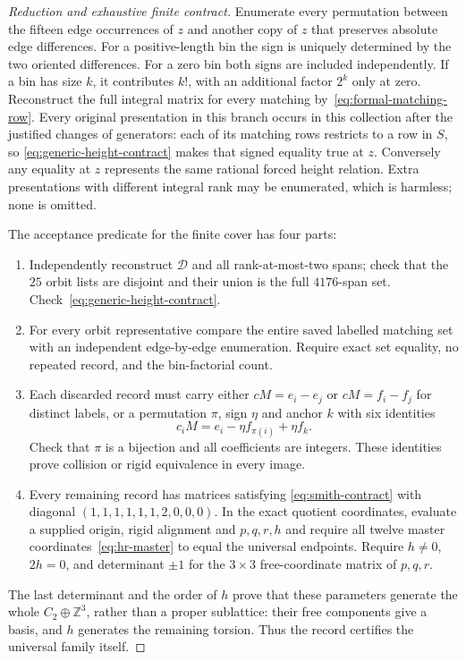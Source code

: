 \documentclass[11pt]{article}
\theoremstyle{remark}
\newcommand{\Z}{\mathbb Z}
\begin{document}
\begin{proof}[Reduction and exhaustive finite contract]
Enumerate every permutation between the fifteen edge occurrences of
$z$ and another copy of $z$ that preserves absolute edge differences.
For a positive-length bin the sign is uniquely determined by the two
oriented differences. For a zero bin both signs are included independently.
If a bin has size $k$, it contributes $k!$, with an additional factor
$2^k$ only at zero. Reconstruct the full integral matrix for every
matching by~\eqref{eq:formal-matching-row}. Every original presentation
in this branch occurs in this collection after the justified changes of
generators: each of its matching rows restricts to a row in $S$, so
\eqref{eq:generic-height-contract} makes that signed equality true at
$z$. Conversely any equality at $z$ represents the same rational forced
height relation. Extra presentations with different integral rank may
be enumerated, which is harmless; none is omitted.

The acceptance predicate for the finite cover has four parts:
\begin{enumerate}
 \item Independently reconstruct $\mathcal D$ and all rank-at-most-two
 spans; check that the $25$ orbit lists are disjoint and their union is
 the full $4176$-span set. Check~\eqref{eq:generic-height-contract}.
 \item For every orbit representative compare the entire saved labelled
 matching set with an independent edge-by-edge enumeration. Require
 exact set equality, no repeated record, and the bin-factorial count.
 \item Each discarded record must carry either $cM=e_i-e_j$ or
 $cM=f_i-f_j$ for distinct labels, or a permutation $\pi$, sign $\eta$
 and anchor $k$ with six identities
 \[
 c_iM=e_i-\eta f_{\pi(i)}+\eta f_k.
 \]
 Check that $\pi$ is a bijection and all coefficients are integers.
 These identities prove collision or rigid equivalence in every image.
 \item Every remaining record has matrices satisfying
 \eqref{eq:smith-contract} with diagonal
 $(1,1,1,1,1,1,2,0,0,0)$. In the exact quotient coordinates, evaluate
 a supplied origin, rigid alignment and $p,q,r,h$ and require all twelve
 master coordinates~\eqref{eq:hr-master} to equal the universal endpoints.
 Require $h\ne0$, $2h=0$, and determinant $\pm1$ for the $3\times3$
 free-coordinate matrix of $p,q,r$.
\end{enumerate}
The last determinant and the order of $h$ prove that these parameters
generate the whole $C_2\oplus\Z^3$, rather than a proper sublattice:
their free components give a basis, and $h$ generates the remaining
torsion. Thus the record certifies the universal family itself.


\end{proof}
\end{document}
